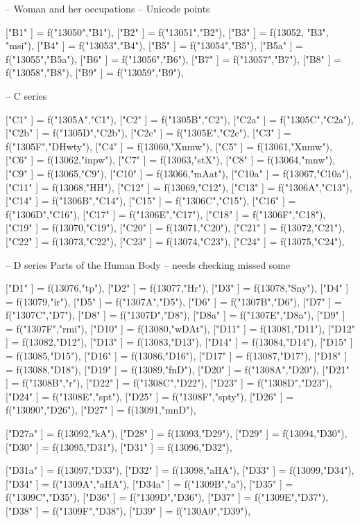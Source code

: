 {-- Woman and her occupations
-- Unicode points

["B1"   ]  = f("13050","B1"),
["B2"   ]  = f("13051","B2"),
["B3"   ]  = f(13052, "B3", "msi"),
["B4"   ]  = f("13053","B4"),
["B5"   ]  = f("13054","B5"),
["B5a"  ] = f("13055","B5a"),
["B6"   ]  = f("13056","B6"),
["B7"   ]  = f("13057","B7"),
["B8"   ]  = f("13058","B8"),
["B9"   ]  = f("13059","B9"),

-- C series

["C1"   ]  = f("1305A","C1"),
["C2"   ]  = f("1305B","C2"),
["C2a"  ]  = f("1305C","C2a"),
["C2b"  ]  = f("1305D","C2b"),
["C2c"  ]  = f("1305E","C2c"),
["C3"   ]  = f("1305F","DHwty"),
["C4"   ]  = f(13060,"Xnmw"),
["C5"   ]  = f(13061,"Xnmw"),
["C6"   ]  = f(13062,"inpw"),
["C7"   ]  = f(13063,"stX"),
["C8"   ]  = f(13064,"mnw"),
    ["C9"   ]   = f(13065,"C9"),
["C10"  ]  = f(13066,"mAat"),
["C10a" ]  = f(13067,"C10a"),
["C11"  ]  = f(13068,"HH"),
["C12"  ]  = f(13069,"C12"),
["C13"  ]  = f("1306A","C13"),
["C14"  ]  = f("1306B","C14"),
["C15"  ]  = f("1306C","C15"),
["C16"  ]  = f("1306D","C16"),
["C17"  ]  = f("1306E","C17"),
["C18"  ]  = f("1306F","C18"),
["C19"  ]  = f(13070,"C19"),
["C20"  ]  = f(13071,"C20"),
["C21"  ]  = f(13072,"C21"),
["C22"  ]  = f(13073,"C22"),
["C23"  ]  = f(13074,"C23"),
["C24"  ]  = f(13075,"C24"),

-- D series Parts of the Human Body
-- needs checking missed some

["D1"   ]   = f(13076,"tp"),
["D2"   ]   = f(13077,"Hr"),
["D3"   ]  = f(13078,"Sny"),
["D4"   ]   = f(13079,"ir"),
["D5"   ]   = f("1307A","D5"),
["D6"   ]   = f("1307B","D6"),
["D7"   ]   = f("1307C","D7"),
["D8"   ]  = f("1307D","D8"),
["D8a"  ] = f("1307E","D8a"),
["D9"   ]   = f("1307F","rmi"),
["D10"  ]  = f(13080,"wDAt"),
["D11"  ]  = f(13081,"D11"),
["D12"  ]  = f(13082,"D12"),
["D13"  ]  = f(13083,"D13"),
["D14"  ]  = f(13084,"D14"),
["D15"  ]  = f(13085,"D15"),
["D16"  ]  = f(13086,"D16"),
["D17"  ]  = f(13087,"D17"),
["D18"  ]  = f(13088,"D18"),
["D19"  ]  = f(13089,"fnD"),
["D20"  ]  = f("1308A","D20"),
["D21"  ]  = f("1308B","r"),
["D22"  ]  = f("1308C","D22"),
["D23"  ]  = f("1308D","D23"),
["D24"  ]  = f("1308E","spt"),
["D25"  ]  = f("1308F","spty"),
["D26"  ]  = f("13090","D26"),
["D27"  ]  = f(13091,"mnD"),

["D27a" ]  = f(13092,"kA"),
["D28"  ]  = f(13093,"D29"),
["D29"  ]  = f(13094,"D30"),
["D30"  ]  = f(13095,"D31"),
["D31"  ]  = f(13096,"D32"),

["D31a" ]  = f(13097,"D33"),
["D32"  ]  = f(13098,"aHA"),
["D33"  ]  = f(13099,"D34"),
["D34"  ]  = f("1309A","aHA"),
["D34a" ]  = f("1309B","a"),
["D35"  ]  = f("1309C","D35"),
["D36"  ]  = f("1309D","D36"),
["D37"  ]  = f("1309E","D37"),
["D38"  ]  = f("1309F","D38"),
["D39"  ]  = f("130A0","D39"),

}
